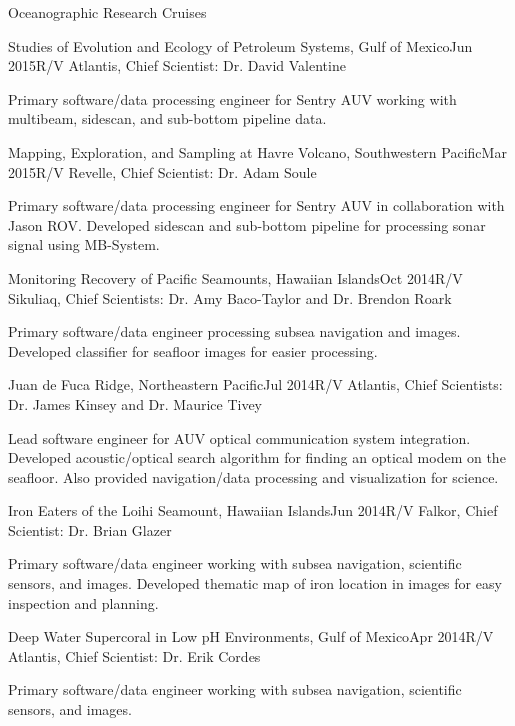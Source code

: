 \documentclass{resume} %
\begin{document}
\begin{rSection}{Oceanographic Research Cruises}
\begin{rSubsection}{Studies of Evolution and Ecology of Petroleum Systems, Gulf of Mexico}{Jun 2015}{R/V Atlantis, Chief Scientist: Dr. David Valentine}{}
\item{Primary software/data processing engineer for Sentry AUV working with multibeam, sidescan, and sub-bottom pipeline data.}
\end{rSubsection}
\begin{rSubsection}{Mapping, Exploration, and Sampling at Havre Volcano, Southwestern Pacific}{Mar 2015}{R/V Revelle, Chief Scientist: Dr. Adam Soule}{}
\item{Primary software/data processing engineer for Sentry AUV in collaboration with Jason ROV. Developed sidescan and sub-bottom pipeline for processing sonar signal using MB-System.}
\end{rSubsection}
\begin{rSubsection}{Monitoring Recovery of Pacific Seamounts, Hawaiian Islands}{Oct 2014}{R/V Sikuliaq, Chief Scientists: Dr. Amy Baco-Taylor and Dr. Brendon Roark}{}
\item{Primary software/data engineer processing subsea navigation and images. Developed classifier for seafloor images for easier processing.}
\end{rSubsection}
\begin{rSubsection}{Juan de Fuca Ridge, Northeastern Pacific}{Jul 2014}{R/V Atlantis, Chief Scientists: Dr. James Kinsey and Dr. Maurice Tivey}{}
\item{Lead software engineer for AUV optical communication system integration. Developed acoustic/optical search algorithm for finding an optical modem on the seafloor. Also provided navigation/data processing and visualization for science.}
\end{rSubsection}
\begin{rSubsection}{Iron Eaters of the Loihi Seamount, Hawaiian Islands}{Jun 2014}{R/V Falkor, Chief Scientist: Dr. Brian Glazer}{}
\item{Primary software/data engineer working with subsea navigation, scientific sensors, and images. Developed thematic map of iron location in images for easy inspection and planning. }
\end{rSubsection}
\begin{rSubsection}{Deep Water Supercoral in Low pH Environments, Gulf of Mexico}{Apr 2014}{R/V Atlantis, Chief Scientist: Dr. Erik Cordes}{}
\item{Primary software/data engineer working with subsea navigation, scientific sensors, and images.}

\end{rSubsection}
\end{rSection}
\end{document}

